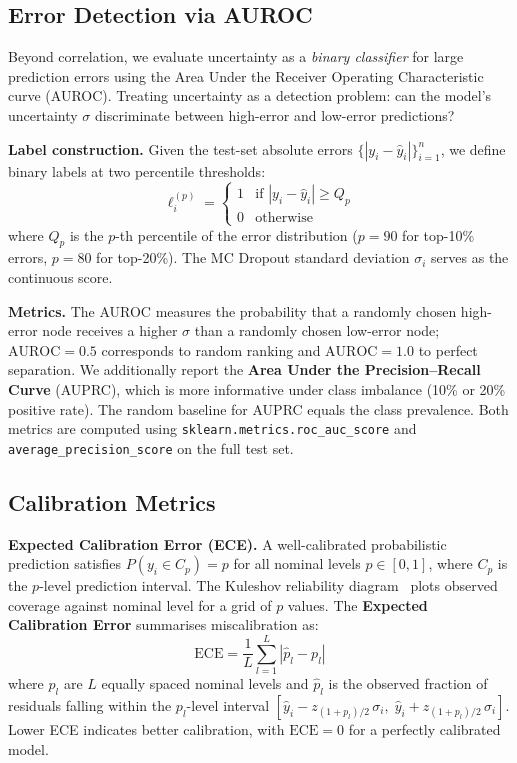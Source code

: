 \subsection{Error Detection via AUROC}\label{sec:auroc_method}

Beyond correlation, we evaluate uncertainty as a \emph{binary classifier} for large prediction errors using the Area Under the Receiver Operating Characteristic curve (AUROC). Treating uncertainty as a detection problem: can the model's uncertainty $\sigma$ discriminate between high-error and low-error predictions?

\textbf{Label construction.} Given the test-set absolute errors $\{|y_i - \hat{y}_i|\}_{i=1}^{n}$, we define binary labels at two percentile thresholds:
\begin{equation}
    \ell_i^{(p)} = \begin{cases} 1 & \text{if } |y_i - \hat{y}_i| \geq Q_p \\ 0 & \text{otherwise} \end{cases}
\end{equation}
where $Q_p$ is the $p$-th percentile of the error distribution ($p = 90$ for top-10\% errors, $p = 80$ for top-20\%). The MC Dropout standard deviation $\sigma_i$ serves as the continuous score.

\textbf{Metrics.} The AUROC measures the probability that a randomly chosen high-error node receives a higher $\sigma$ than a randomly chosen low-error node; $\text{AUROC} = 0.5$ corresponds to random ranking and $\text{AUROC} = 1.0$ to perfect separation. We additionally report the \textbf{Area Under the Precision--Recall Curve} (AUPRC), which is more informative under class imbalance (10\% or 20\% positive rate). The random baseline for AUPRC equals the class prevalence. Both metrics are computed using \texttt{sklearn.metrics.roc\_auc\_score} and \texttt{average\_precision\_score} on the full test set.

\subsection{Calibration Metrics}\label{sec:calibration_metrics}

\textbf{Expected Calibration Error (ECE).} A well-calibrated probabilistic prediction satisfies $P(y_i \in C_p) = p$ for all nominal levels $p \in [0,1]$, where $C_p$ is the $p$-level prediction interval. The Kuleshov reliability diagram~\cite{kuleshov2018accurate} plots observed coverage against nominal level for a grid of $p$ values. The \textbf{Expected Calibration Error} summarises miscalibration as:
\begin{equation}
    \text{ECE} = \frac{1}{L}\sum_{l=1}^{L} \left| \hat{p}_l - p_l \right|
\end{equation}
where $p_l$ are $L$ equally spaced nominal levels and $\hat{p}_l$ is the observed fraction of residuals falling within the $p_l$-level interval $[\hat{y}_i - z_{(1+p_l)/2}\,\sigma_i,\; \hat{y}_i + z_{(1+p_l)/2}\,\sigma_i]$. Lower ECE indicates better calibration, with $\text{ECE} = 0$ for a perfectly calibrated model.

